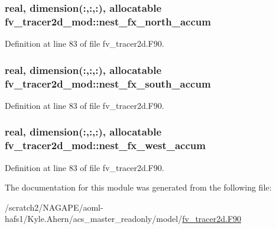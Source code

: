 \subsubsection[{nest\-\_\-fx\-\_\-north\-\_\-accum}]{\setlength{\rightskip}{0pt plus 5cm}real, dimension(\-:,\-:,\-:), allocatable fv\-\_\-tracer2d\-\_\-mod\-::nest\-\_\-fx\-\_\-north\-\_\-accum\hspace{0.3cm}{\ttfamily [private]}}\label{classfv__tracer2d__mod_a9616f908472d3cd36e6e3ed3ac287ed5}


Definition at line 83 of file fv\-\_\-tracer2d.\-F90.

\subsubsection[{nest\-\_\-fx\-\_\-south\-\_\-accum}]{\setlength{\rightskip}{0pt plus 5cm}real, dimension(\-:,\-:,\-:), allocatable fv\-\_\-tracer2d\-\_\-mod\-::nest\-\_\-fx\-\_\-south\-\_\-accum\hspace{0.3cm}{\ttfamily [private]}}\label{classfv__tracer2d__mod_a3bf4ea79bede8504fd2df61b9837991c}


Definition at line 83 of file fv\-\_\-tracer2d.\-F90.

\subsubsection[{nest\-\_\-fx\-\_\-west\-\_\-accum}]{\setlength{\rightskip}{0pt plus 5cm}real, dimension(\-:,\-:,\-:), allocatable fv\-\_\-tracer2d\-\_\-mod\-::nest\-\_\-fx\-\_\-west\-\_\-accum\hspace{0.3cm}{\ttfamily [private]}}\label{classfv__tracer2d__mod_afedafbd659d48b128ce6461b3483b85a}


Definition at line 83 of file fv\-\_\-tracer2d.\-F90.



The documentation for this module was generated from the following file\-:\begin{DoxyCompactItemize}
\item 
/scratch2/\-N\-A\-G\-A\-P\-E/aoml-\/hafs1/\-Kyle.\-Ahern/acs\-\_\-master\-\_\-readonly/model/\hyperlink{fv__tracer2d_8F90}{fv\-\_\-tracer2d.\-F90}\end{DoxyCompactItemize}
